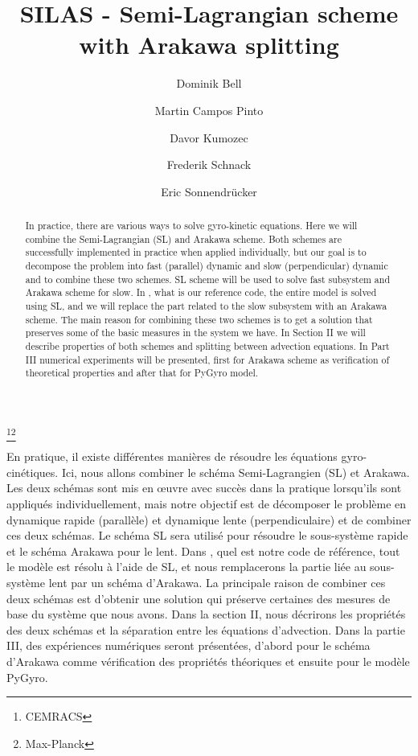 \documentclass[proc]{edpsmath}
\begin{document}
\title{SILAS - Semi-Lagrangian scheme with Arakawa splitting}
\thanks{CEMRACS}\thanks{Max-Planck}%
%
\author{Dominik Bell}\address{Max-Planck-Institut für Plasmaphysik, Garching, Germany; }
\author{Martin Campos Pinto}
\author{Davor Kumozec}\address{Faculty of Sciences, University of Novi Sad, Serbia; }
\author{Frederik Schnack}
\author{Eric Sonnendrücker}

\begin{abstract}
In practice, there are various ways to solve gyro-kinetic equations. Here we will combine the Semi-Lagrangian (SL) and Arakawa scheme. Both schemes are successfully implemented in practice when applied individually, but our goal is to decompose the problem into fast (parallel) dynamic and slow (perpendicular) dynamic and to combine these two schemes. SL scheme will be used to solve fast subsystem and Arakawa scheme for slow. In \cite{pygyro_code}, what is our reference code, the entire model is solved using SL, and we will replace the part related to the slow subsystem with an Arakawa scheme. The main reason for combining these two schemes is to get a solution that preserves some of the basic measures in the system we have. In Section II we will describe properties of both schemes and splitting between advection equations. In Part III numerical experiments will be presented, first for Arakawa scheme as verification of theoretical properties and after that for PyGyro model.
\end{abstract}
%
\begin{resume}
En pratique, il existe différentes manières de résoudre les équations gyro-cinétiques. Ici, nous allons combiner le schéma Semi-Lagrangien (SL) et Arakawa. Les deux schémas sont mis en œuvre avec succès dans la pratique lorsqu'ils sont appliqués individuellement, mais notre objectif est de décomposer le problème en dynamique rapide (parallèle) et dynamique lente (perpendiculaire) et de combiner ces deux schémas. Le schéma SL sera utilisé pour résoudre le sous-système rapide et le schéma Arakawa pour le lent. Dans \cite{pygyro_code}, quel est notre code de référence, tout le modèle est résolu à l'aide de SL, et nous remplacerons la partie liée au sous-système lent par un schéma d'Arakawa. La principale raison de combiner ces deux schémas est d'obtenir une solution qui préserve certaines des mesures de base du système que nous avons. Dans la section II, nous décrirons les propriétés des deux schémas et la séparation entre les équations d'advection. Dans la partie III, des expériences numériques seront présentées, d'abord pour le schéma d'Arakawa comme vérification des propriétés théoriques et ensuite pour le modèle PyGyro.
\end{resume}
\end{document}
